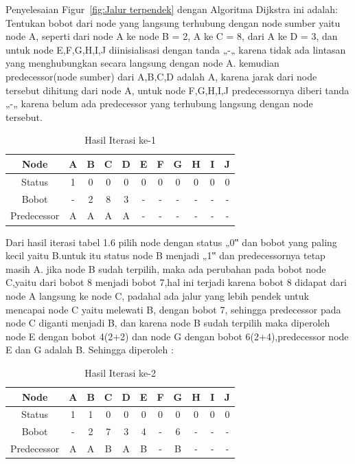 \begin{enumerate}
Penyelesaian Figur~\ref{fig:Jalur terpendek} dengan Algoritma Dijkstra ini adalah:
Tentukan bobot dari node yang langsung terhubung dengan node sumber yaitu node A, seperti dari node A ke node B = 2, A ke C = 8, dari A ke D = 3, dan untuk node E,F,G,H,I,J diinisialisasi dengan tanda „-„ karena tidak ada lintasan yang menghubungkan secara langsung dengan node A. kemudian predecessor(node sumber) dari A,B,C,D adalah A, karena jarak dari node tersebut dihitung dari node A, untuk node F,G,H,I,J predecessornya diberi tanda „-„ karena belum ada predecessor yang terhubung langsung dengan node tersebut.

\begin{table}[htbp]
\begin{center}
\begin{tabular}{|c|c|c|c|c|c|c|c|c|c|c|}
\hline
Node & A & B & C & D & E & F & G & H & I & J \\
\hline
Status & 1 & 0 & 0 & 0 & 0 & 0 & 0 & 0 & 0 & 0\\
\hline
Bobot & - & 2 & 8 & 3 & - & - & - & - & - & - \\
\hline
Predecessor & A & A & A & A & - & - & - & - & -  & - \\
\hline
\end{tabular}
\caption{Hasil Iterasi ke-1}
\end{center}
\end{table}

Dari hasil iterasi tabel 1.6 pilih node dengan status „0‟ dan bobot yang paling kecil yaitu B.untuk itu status node B menjadi „1‟ dan predecessornya tetap masih A. jika node B sudah terpilih, maka ada perubahan pada bobot node C,yaitu dari bobot 8 menjadi bobot 7,hal ini terjadi karena bobot 8 didapat dari node A langsung ke node C, padahal ada jalur yang lebih pendek untuk mencapai node C yaitu melewati B, dengan bobot 7, sehingga predecessor pada node C diganti menjadi B, dan karena node B sudah terpilih maka diperoleh node E dengan bobot 4(2+2) dan node G dengan bobot 6(2+4),predecessor node E dan G adalah B. Sehingga diperoleh :

\begin{table}[htbp]
\begin{center}
\begin{tabular}{|c|c|c|c|c|c|c|c|c|c|c|}
\hline
Node & A & B & C & D & E & F & G & H & I & J \\
\hline
Status & 1 & 1 & 0 & 0 & 0 & 0 & 0 & 0 & 0 & 0\\
\hline
Bobot & - & 2 & 7 & 3 & 4 & - & 6 & - & - & - \\
\hline
Predecessor & A & A & B & A & B & - & B & - & -  & - \\
\hline
\end{tabular}
\caption{Hasil Iterasi ke-2}
\end{center}
\end{table}


\end{enumerate}
